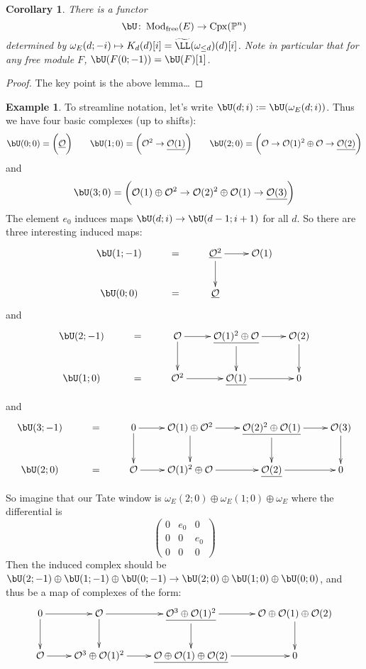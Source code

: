 \documentclass[12pt]{amsart}
\newtheorem{cor}[lemma]{Corollary}
\theoremstyle{definition}
\newtheorem{example}[lemma]{Example}
\theoremstyle{remark}
\newcommand{\PP}{\mathbb P}
\newcommand{\cO}{{\mathcal O}}
\def\DC{\operatorname{DC}}
\def\Mod{\operatorname{Mod}}
\def\Cpx{\operatorname{Cpx}}
\begin{document}
\begin{cor}
There is a functor
\[
\bU\colon  \Mod_{\text{free}}(E)\to \Cpx(\PP^n)
\]
determined by $\omega_E(d;-i)\mapsto K_d(d)[i] = \widetilde{\LL}(\omega_{\leq d})(d)[i]$.
Note in particular that for any free module $F$, $\bU( F(0;-1)) = \bU(F)[1]$.
\end{cor}
\begin{proof}
The key point is the above lemma\dots
\end{proof}
\begin{example}
To streamline notation, let's write $\bU(d;i):=\bU(\omega_E(d;i))$.  Thus we have four basic complexes (up to shifts):
\[
\bU(0;0) = \bigg( \underline{\cO}\bigg) \qquad \bU(1;0) = \bigg( \cO^2\to \underline{\cO(1)}\bigg)  \qquad \bU(2;0) = \bigg( \cO\to \cO(1)^2\oplus \cO \to \underline{\cO(2)} \bigg)
\]
and
\[
 \bU(3;0) = \bigg( \cO(1)\oplus \cO^2 \to \cO(2)^2 \oplus \cO(1) \to \underline{\cO(3)} \bigg)
\]
The element $e_0$ induces maps $\bU(d;i)\to \bU(d-1;i+1)$ for all $d$.  So there are three interesting induced maps:
\[
\xymatrix{
\bU(1;-1) & =& \underline{\cO^2}\ar[r]\ar[d]& \cO(1)\\
\bU(0;0) & = &\underline{\cO}&
}
\]
and
\[
\xymatrix{
\bU(2;-1) & =&\cO\ar[r]\ar[d]& \underline{\cO(1)^2\oplus \cO} \ar[r]\ar[d]& {\cO(2)}\ar[d]\\
\bU(1;0) & = &{\cO^2}\ar[r]& \underline{\cO(1)}\ar[r]&0
}
\]

and
\[
\xymatrix{
\bU(3;-1) & =&0\ar[r]\ar[d]&\cO(1)\oplus \cO^2\ar[r]\ar[d]& \underline{\cO(2)^2\oplus \cO(1)} \ar[r]\ar[d]& {\cO(3)}\ar[d]\\
\bU(2;0) & =& \cO\ar[r]&\cO(1)^2\oplus \cO\ar[r]& \underline{\cO(2)}\ar[r]&0
}
\]

So imagine that our Tate window is  $\omega_E(2;0)\oplus \omega_E(1;0) \oplus \omega_E$ where the differential is
\[
\begin{pmatrix}
0&e_0&0\\
0&0&e_0\\
0&0&0
\end{pmatrix}
\]
Then the induced complex should be $\bU(2;-1)\oplus \bU(1;-1)\oplus \bU(0;-1) \to \bU(2;0)\oplus \bU(1;0)\oplus \bU(0;0)$, and thus be a map of complexes of the form:
\[
\xymatrix{
0 \ar[r]\ar[d]& \cO\ar[r]\ar[d] &\underline{\cO^3\oplus \cO(1)^2} \ar[r]\ar[d] & {\cO\oplus \cO(1)\oplus \cO(2)}\ar[d]\\
\cO\ar[r]&\cO^3\oplus \cO(1)^2 \ar[r] & \underline{\cO\oplus \cO(1)\oplus \cO(2)} \ar[r]& 0
}
\]
\end{example}
\end{document}
